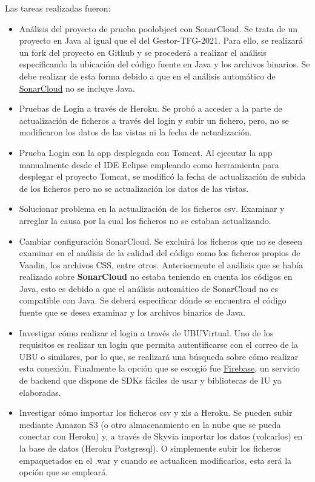 Las tareas realizadas fueron:
\begin{itemize}
	\item Análisis del proyecto de prueba poolobject con SonarCloud.
		Se trata de un proyecto en Java al igual que el del Gestor-TFG-2021. Para ello, se realizará un fork del proyecto en Github y se procederá a realizar el análisis especificando la ubicación del código fuente en Java y los archivos binarios. Se debe realizar de esta forma debido a que en el análisis automático de \href{https://sonarcloud.io/}{SonarCloud} no se incluye Java.
	\item Pruebas de Login a través de Heroku. 
		Se probó a acceder a la parte de actualización de ficheros a través del login y subir un fichero, pero, no se modificaron los datos de las vistas ni la fecha de actualización.
	\item Prueba Login con la app desplegada con Tomcat. 
		Al ejecutar la app manualmente desde el IDE Eclipse empleando como herramienta para desplegar el proyecto Tomcat, se modificó la fecha de actualización de subida de los ficheros pero no se actualización los datos de las vistas.
	\item Solucionar problema en la actualización de los ficheros csv.
		 Examinar y arreglar la causa por la cual los ficheros no se estaban actualizando.
	\item Cambiar configuración SonarCloud. 
		Se excluirá los ficheros que no se deseen examinar en el análisis de la calidad del código como los ficheros propios de Vaadin, los archivos CSS, entre otros. Anteriormente el análisis que se había realizado sobre \textbf{SonarCloud} no estaba teniendo en cuenta los códigos en Java, esto es debido a que el análisis automático de SonarCloud no es compatible con Java. Se deberá especificar dónde se encuentra el código fuente que se desea examinar y los archivos binarios de Java.
	\item Investigar cómo realizar el login a través de UBUVirtual. 
		Uno de los requisitos es realizar un login que permita autentificarse con el correo de la UBU o similares, por lo que, se realizará una búsqueda sobre cómo realizar esta conexión. Finalmente la opción que se escogió fue \href{https://firebase.google.com/}{Firebase}, un servicio de backend que dispone de SDKs fáciles de usar y bibliotecas de IU ya elaboradas.
	\item Investigar cómo importar los ficheros csv y xls a Heroku.
		Se pueden subir mediante Amazon S3 (o otro almacenamiento en la nube que se pueda conectar con Heroku) y, a través de Skyvia importar los datos (volcarlos) en la base de datos (Heroku Postgresql). O simplemente subir los ficheros empaquetados en el .war y cuando se actualicen modificarlos, esta será la opción que se empleará.

\end{itemize}
